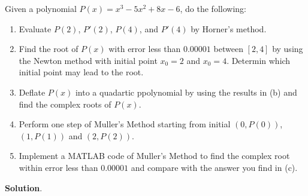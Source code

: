\documentclass[11pt]{article}
\theoremstyle{break}
\numberwithin{equation}{theorem}
\begin{document}
\newpage
\begin{problem}\label{problem 11}
    Given a polynomial $P(x) = x^3-5x^2+8x-6$, do the following:
    \begin{enumerate}
        \item Evaluate $P(2)$, $P'(2)$, $P(4)$, and $P'(4)$ by Horner's method.
        \item Find the root of $P(x)$ with error less than $0.00001$ between $[2, 4]$ by using the Newton method with initial point $x_0 = 2$ and $x_0 = 4$. Determin which initial point may lead to the root.
        \item Deflate $P(x)$ into a quadartic ppolynomial by using the results in (b) and find the complex roots of $P(x)$.
        \item Perform one step of Muller's Method starting from initial $(0,P(0))$, $(1,P(1))$ and $(2,P(2))$.
        \item Implement a MATLAB code of Muller's Method to find the complex root within error less than $0.00001$ and compare with the answer you find in (c).
    \end{enumerate}
\end{problem}
\textbf{Solution}.
\end{document}

